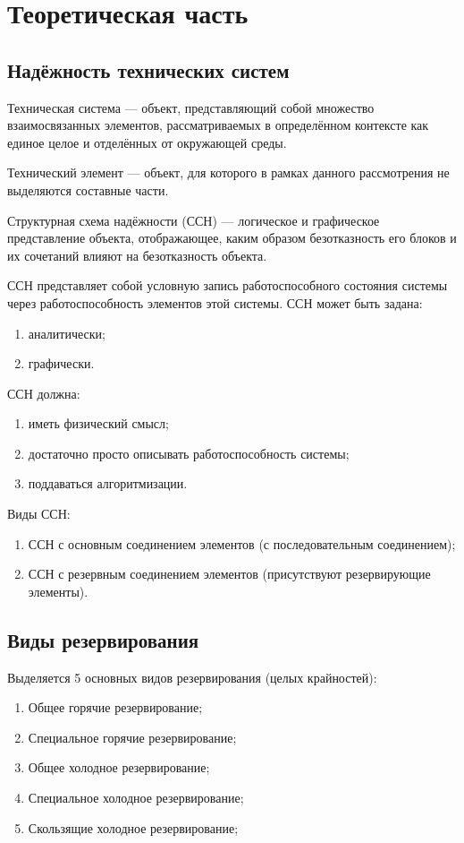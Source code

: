 \chapter{Теоретическая часть}
\section{Надёжность технических систем}

	Техническая система --- объект, представляющий собой множество взаимосвязанных элементов, рассматриваемых в определённом контексте как единое целое и отделённых от окружающей среды.
	
	Технический элемент --- объект, для которого в рамках данного рассмотрения не выделяются составные части.
	
	Структурная схема надёжности (ССН) --- логическое и графическое представление объекта, отображающее, каким образом безотказность его блоков и их сочетаний влияют на безотказность объекта. 

	ССН представляет собой условную запись работоспособного состояния системы через работоспособность элементов этой системы. ССН может быть задана:
	\begin{enumerate}
		\item аналитически;
		\item графически. 
	\end{enumerate}
	ССН должна:
	\begin{enumerate}
		\item иметь физический смысл;
		\item достаточно просто описывать работоспособность системы; 
		\item поддаваться алгоритмизации. 
	\end{enumerate}
	Виды ССН: 
	\begin{enumerate}
		\item ССН с основным соединением элементов (с последовательным соединением); 
		\item ССН с резервным соединением элементов (присутствуют резервирующие элементы).
	\end{enumerate}
\section{Виды резервирования}
	Выделяется 5 основных видов резервирования (целых крайностей):
	\begin{enumerate}
		\item Общее горячие резервирование;
		\item Специальное горячие резервирование;
		\item Общее холодное резервирование;
		\item Специальное холодное резервирование;
		\item Скользящие холодное резервирование;
	\end{enumerate}
